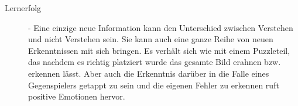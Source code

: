 %
%
%
%
\begin{description}

\item[Lernerfolg] - Eine einzige neue Information kann den Unterschied zwischen Verstehen und nicht Verstehen sein. Sie kann auch eine ganze Reihe von neuen Erkenntnissen mit sich bringen. Es verhält sich wie mit einem Puzzleteil, das nachdem es richtig platziert wurde das gesamte Bild erahnen bzw. erkennen lässt. Aber auch die Erkenntnis darüber in die Falle eines Gegenspielers getappt zu sein und die eigenen Fehler zu erkennen ruft positive Emotionen hervor.
\cite[S. 19 ff.]{Adams:1515529}
%
%
%
% 


\end{description}
